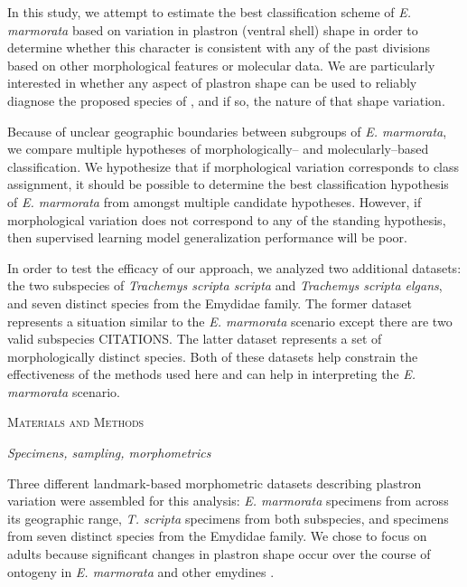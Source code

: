 \documentclass[12pt,letterpaper]{article}
\renewcommand{\section}[1]{%
\bigskip
\begin{center}
\begin{Large}
\normalfont\scshape #1
\medskip
\end{Large}
\end{center}}
\renewcommand{\subsection}[1]{%
\bigskip
\begin{center}
\begin{large}
\normalfont\itshape #1
\end{large}
\end{center}}
\begin{document}
In this study, we attempt to estimate the best classification scheme of \textit{E. marmorata} based on variation in plastron (ventral shell) shape in order to determine whether this character is consistent with any of the past divisions based on other morphological features or molecular data. We are particularly interested in whether any aspect of plastron shape can be used to reliably diagnose the proposed species of \citet{Spinks2014}, and if so, the nature of that shape variation.


Because of unclear geographic boundaries between subgroups of \textit{E. marmorata}, we compare multiple hypotheses of morphologically-- and molecularly--based classification. We hypothesize that if morphological variation corresponds to class assignment, it should be possible to determine the best classification hypothesis of \textit{E. marmorata} from amongst multiple candidate hypotheses. However, if morphological variation does not correspond to any of the standing hypothesis, then supervised learning model generalization performance will be poor.

In order to test the efficacy of our approach, we analyzed two additional datasets: the two subspecies of \textit{Trachemys scripta scripta} and \textit{Trachemys scripta elgans}, and seven distinct species from the Emydidae family. The former dataset represents a situation similar to the \textit{E. marmorata} scenario except there are two valid subspecies CITATIONS. The latter dataset represents a set of morphologically distinct species. Both of these datasets help constrain the effectiveness of the methods used here and can help in interpreting the \textit{E. marmorata} scenario.


\section{Materials and Methods}
\subsection{Specimens, sampling, morphometrics}
Three different landmark-based morphometric datasets describing plastron variation were assembled for this analysis: \textit{E. marmorata} specimens from across its geographic range, \textit{T. scripta} specimens from both subspecies, and specimens from seven distinct species from the Emydidae family. We chose to focus on adults because significant changes in plastron shape occur over the course of ontogeny in \textit{E. marmorata} and other emydines \citep{Angielczyk2013a}.
\end{document}
